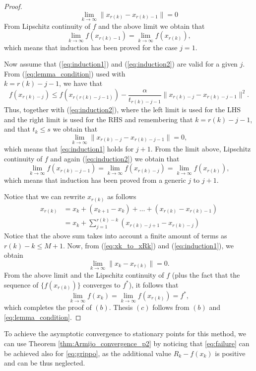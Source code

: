 \documentclass[10pt,a4paper]{article}
\begin{document}
\begin{proof}
	$$ \displaystyle \lim_{k \to \infty} \| x_{r(k)} -x_{r(k)-1}\| = 0$$
	From Lipschitz continuity of $f$ and the above limit we obtain that
	\begin{equation*}
		\displaystyle \lim_{k\to\infty} f(x_{r(k) -1}) = \displaystyle \lim_{k\to\infty} f(x_{r(k) }),
	\end{equation*}
	which means that induction has been proved for the case $j=1$.
	\par Now assume that (\ref{eq:induction1}) and (\ref{eq:induction2}) are valid for a given $j$. From (\ref{eq:lemma_condition}) used with\\ $k = r(k) -j -1$, we have that
	$$ f(x_{r(k) -j}) \leq f(x_{r(r(k)-j -1)}) - \frac{\alpha}{t_{r(k)-j-1}}\| x_{r(k)-j} - x_{r(k)-j-1}\|^2.$$
	Thus, together with (\ref{eq:induction2}), where the left limit is used for the LHS and the right limit is used for the RHS and remembering that $k=  r(k) -j -1$, and that $t_k\leq s$ we obtain that
	$$ \displaystyle \lim_{k \to \infty} \| x_{r(k)-j} - x_{r(k)-j-1} \| = 0,$$
	which means that \eqref{eq:induction1} holds for $j+1$.	From the limit above, Lipschitz continuity of $f$ and again (\ref{eq:induction2}) we obtain that
	\begin{equation*}
		\displaystyle \lim_{k\to\infty} f(x_{r(k)-j-1}) =\displaystyle \lim_{k\to\infty} f(x_{r(k)-j})  = \displaystyle \lim_{k\to\infty} f(x_{r(k)}), 
	\end{equation*}
	which means that induction has been proved from a generic $j$ to $j+1$.
	\par Notice that we can rewrite $x_{r(k)}$ as follows 
	\begin{equation} \label{eq:xk_to_xRk}
		\begin{split}
			x_{r(k)} &= x_k + (x_{k+1} - x_k) + \dots +(x_{r(k)} - x_{r(k)-1})\\
			&= x_k + \sum_{j=1}^{r(k)-k} \left (x_{r(k) -j +1} - x_{r(k)-j} \right ) 
		\end{split}
	\end{equation}
	Notice that the above sum takes into account a finite amount of terms as $r(k) -k  \leq M +1$. Now, from (\ref{eq:xk_to_xRk}) and (\ref{eq:induction1}), we obtain 
	\begin{equation*}
		\displaystyle \lim_{k\to \infty} \| x_k - x_{r(k)}\| = 0.
	\end{equation*}
	From the above limit and the Lipschitz continuity of $f$ (plus the fact that the sequence of $\{f(x_{r(k)})\}$ converges to $f^*$), it follows that
	$$ \displaystyle\lim_{k\to \infty} f(x_k) = \displaystyle\lim_{k\to \infty}  f(x_{r(k)})= f^*,$$
	which completes the proof of $(b)$. Thesis $(c)$ follows from $(b)$ and \eqref{eq:lemma_condition}. 
\end{proof}
To achieve the asymptotic convergence to stationary points for this method, we can use Theorem \ref{thm:Armijo_convergence_p2} by noticing that \eqref{eq:failure} can be achieved also for \eqref{eq:grippo}, as the additional value $R_k-f(x_k)$ is positive and can be thus neglected.
\end{document}
